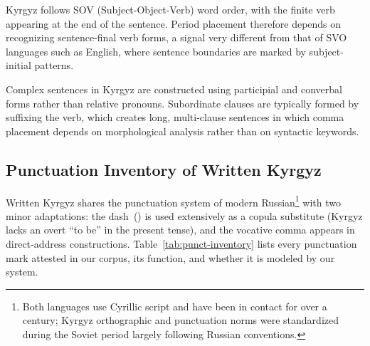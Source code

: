 \documentclass[manuscript, review]{acmart}
\begin{document}
Kyrgyz follows SOV (Subject-Object-Verb) word order, with the finite verb appearing at the end of the sentence. Period placement therefore depends on recognizing sentence-final verb forms, a signal very different from that of SVO languages such as English, where sentence boundaries are marked by subject-initial patterns.

Complex sentences in Kyrgyz are constructed using participial and converbal forms rather than relative pronouns. Subordinate clauses are typically formed by suffixing the verb, which creates long, multi-clause sentences in which comma placement depends on morphological analysis rather than on syntactic keywords.

\subsection{Punctuation Inventory of Written Kyrgyz}
\label{sec:punct-inventory}

Written Kyrgyz shares the punctuation system of modern Russian\footnote{Both languages use Cyrillic script and have been in contact for over a century; Kyrgyz orthographic and punctuation norms were standardized during the Soviet period largely following Russian conventions.} with two minor adaptations: the dash~(\textendash) is used extensively as a copula substitute (Kyrgyz lacks an overt ``to be'' in the present tense), and the vocative comma appears in direct-address constructions. Table~\ref{tab:punct-inventory} lists every punctuation mark attested in our corpus, its function, and whether it is modeled by our system.
\end{document}
